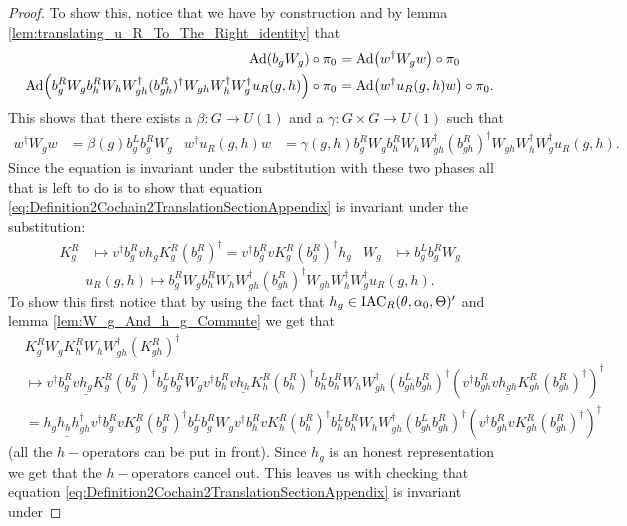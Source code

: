 \documentclass[11pt,a4paper,twoside]{article}
\numberwithin{equation}{section}
\begin{document}
	\begin{proof}
		To show this, notice that we have by construction and by lemma \ref{lem:translating_u_R_To_The_Right_identity} that
		\begin{align}
			\Ad{b_g W_g}\circ\pi_0&=\Ad{w^\dagger W_g w}\circ\pi_0\\
			\Ad{b_g^R W_g b_h^R W_h W_{gh}^\dagger (b_{gh}^R)^\dagger W_{gh}W_h^\dagger W_g^\dagger u_R(g,h)}\circ\pi_0&=\Ad{w^\dagger u_R(g,h) w}\circ\pi_0.
		\end{align}
		This shows that there exists a $\beta:G\rightarrow U(1)$ and a $\gamma:G\times G\rightarrow U(1)$ such that
		\begin{align}
			w^\dagger W_g w&=\beta(g)b_g^Lb_g^RW_g&w^\dagger u_R(g,h) w&=\gamma(g,h)b_g^R W_g b_h^R W_h W_{gh}^\dagger (b_{gh}^R)^\dagger W_{gh}W_h^\dagger W_g^\dagger u_R(g,h).
		\end{align}
		Since the equation is invariant under the substitution with these two phases all that is left to do is to show that equation \eqref{eq:Definition2Cochain2TranslationSectionAppendix} is invariant under the substitution:
		\begin{align}
			K_g^R&\mapsto v^\dagger b_g^R v h_g K_g^R (b_g^R)^\dagger=v^\dagger b_g^R v K_g^R (b_g^R)^\dagger h_g&W_g&\mapsto b_g^Lb_g^RW_g
		\end{align}
		\begin{equation}
			u_R(g,h)\mapsto b_g^R W_g b_h^R W_h W_{gh}^\dagger (b_{gh}^R)^\dagger W_{gh}W_h^\dagger W_g^\dagger u_R(g,h).
		\end{equation}
		To show this first notice that by using the fact that $h_g\in\textrm{IAC}_R(\theta,\alpha_0,\Theta)'$ and lemma \ref{lem:W_g_And_h_g_Commute} we get that
		\begin{align}
			&K_g^R W_g K_h^R W_ hW_{gh}^\dagger(K_{gh}^R)^\dagger\\
			&\mapsto v^\dagger b_g^R v \underline{h_g} K_g^R (b_g^R)^\dagger b_g^Lb_g^RW_g v^\dagger b_h^R v \underline{h_h} K_h^R (b_h^R)^\dagger b_h^Lb_h^RW_h W_{gh}^\dagger (b_{gh}^Lb_{gh}^R)^\dagger (v^\dagger b_{gh}^R v \underline{h_{gh}} K_{gh}^R (b_{gh}^R)^\dagger)^\dagger\\
			&=\underline{h_gh_hh_{gh}^\dagger} v^\dagger b_g^R v  K_g^R (b_g^R)^\dagger b_g^Lb_g^RW_g v^\dagger b_h^R v  K_h^R (b_h^R)^\dagger b_h^Lb_h^RW_h W_{gh}^\dagger (b_{gh}^Lb_{gh}^R)^\dagger (v^\dagger b_{gh}^R v  K_{gh}^R (b_{gh}^R)^\dagger)^\dagger
		\end{align}
		(all the $h-$operators can be put in front). Since $h_g$ is an honest representation we get that the $h-$operators cancel out. This leaves us with checking that equation \eqref{eq:Definition2Cochain2TranslationSectionAppendix} is invariant under

\end{proof}
\end{document}
